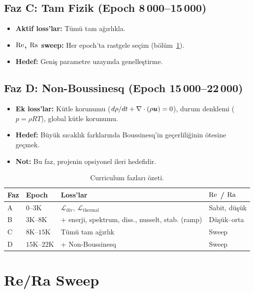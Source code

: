 \subsection{Faz C: Tam Fizik (Epoch 8\,000--15\,000)}

\begin{itemize}
    \item \textbf{Aktif loss'lar:} Tümü tam ağırlıkla.
    \item \textbf{$\mathrm{Re}$, $\mathrm{Ra}$ sweep:} Her epoch'ta rastgele seçim (bölüm~\ref{sec:re_ra_sweep}).
    \item \textbf{Hedef:} Geniş parametre uzayında genelleştirme.
\end{itemize}

\subsection{Faz D: Non-Boussinesq (Epoch 15\,000--22\,000)}

\begin{itemize}
    \item \textbf{Ek loss'lar:} Kütle korunumu ($d\rho/dt + \nabla \cdot(\rho \bm{u}) = 0$), durum denklemi ($p = \rho R T$), global kütle korunumu.
    \item \textbf{Hedef:} Büyük sıcaklık farklarında Boussinesq'in geçerliliğinin ötesine geçmek.
    \item \textbf{Not:} Bu faz, projenin opsiyonel ileri hedefidir.
\end{itemize}

\begin{table}[H]
\centering
\caption{Curriculum fazları özeti.}
\label{tab:curriculum}
\begin{tabular}{@{}llll@{}}
\toprule
\textbf{Faz} & \textbf{Epoch} & \textbf{Loss'lar} & \textbf{$\mathrm{Re}$ / $\mathrm{Ra}$} \\
\midrule
A & $0$--$3$K & $\mathcal{L}_{\text{div}}$, $\mathcal{L}_{\text{thermal}}$ & Sabit, düşük \\
B & $3$K--$8$K & + enerji, spektrum, diss., nusselt, stab. (ramp) & Düşük--orta \\
C & $8$K--$15$K & Tümü tam ağırlık & Sweep \\
D & $15$K--$22$K & + Non-Boussinesq & Sweep \\
\bottomrule
\end{tabular}
\end{table}


\section{Re/Ra Sweep}
\label{sec:re_ra_sweep}


